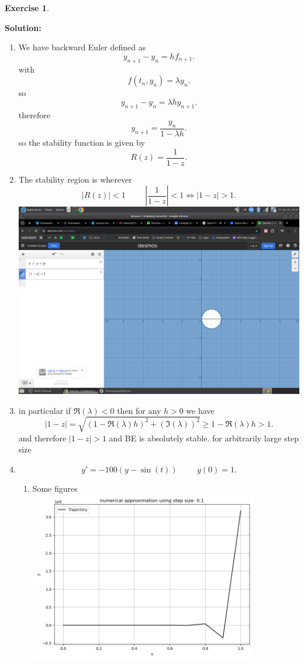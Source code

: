 \documentclass[a4paper,12pt]{scrartcl} %
\newenvironment{solution}
  {\par\color{answercolor}\textbf{Solution:}\ }
  {\par}
\newcounter{customcounter}
\theoremstyle{darktheorem}
\newtheorem{exercise}[customcounter]{Exercise}
\begin{document}
\begin{exercise}
\end{exercise}
\begin{solution}
\begin{enumerate}
\item
We have backward Euler defined as
\[
y_{n+1} - y_n = hf_{n+1}
.\] 
with
\[
f(t_n,y_n) = \lambda y_n
.\] 
so
\[
y_{n+1} - y_n = \lambda h y_{n+1}
.\] 
therefore
\[
y_{n+1} = \frac{y_n}{1-\lambda h}
.\] 
so the stability function is given by
\[
R(z) = \frac{1}{1-z}
.\] 
\item 
    The stability region is wherever
    \[
        |R(z)| < 1 \hspace{1cm} |\frac{1}{1-z}| < 1 \iff |1-z| > 1
    .\] 
    \includegraphics[width=\textwidth]{q1.png}
\item in particular if $\Re(\lambda) < 0$ then for any $h > 0$ we have
    \[
    |1-z| = \sqrt{(1-\Re(\lambda)h)^2 + (\Im(\lambda))^2} \ge 1 - \Re(\lambda)h > 1
    .\] 
    and therefore $|1-z| > 1$ and BE is absolutely stable. for arbitrarily large step size
\item 
    \[
        y' = -100(y-\sin(t)) \hspace{1cm} y(0) = 1
    .\] 
    \begin{enumerate}
        \item Some figures\\
            \includegraphics[width = 10cm]{FE_STEP0.1.png}\\

\end{enumerate}
\end{enumerate}
\end{solution}
\end{document}
